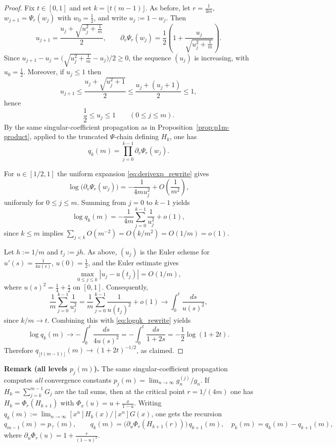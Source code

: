 \documentclass[11pt]{article}
\newcommand{\ptop}{p_{\top}}
\begin{document}
\begin{proof}
Fix \(t\in[0,1]\) and set \(k=\lfloor t(m-1)\rfloor\). As before, let \(r=\frac{1}{4m}\),
\(w_{j+1}=\Psi_r(w_j)\) with \(w_0=\frac12\), and write \(u_j:=1-w_j\). Then
\[
u_{j+1}=\frac{u_j+\sqrt{u_j^2+\frac1m}}{2},
\qquad
\partial_v\Psi_r(w_j)=\frac12\left(1+\frac{u_j}{\sqrt{u_j^2+\frac1m}}\right).
\]
Since \(u_{j+1}-u_j=\bigl(\sqrt{u_j^2+\frac1m}-u_j\bigr)/2\ge0\), the sequence \((u_j)\) is
increasing, with \(u_0=\frac12\). Moreover, if \(u_j\le 1\) then
\[
u_{j+1}\le \frac{u_j+\sqrt{u_j^2+1}}{2}\le \frac{u_j+(u_j+1)}{2}\le 1,
\]
hence
\[
\frac12\le u_j\le 1\qquad (0\le j\le m).
\]
By the same singular-coefficient propagation as in Proposition~\ref{prop:p1m-product},
applied to the truncated \(\Psi\)-chain defining \(H_k\), one has
\[
q_k(m)=\prod_{j=0}^{k-1}\partial_v\Psi_r(w_j).
\]

\medskip
For \(u\in[1/2,1]\) the uniform expansion \eqref{eq:derivexp_rewrite} gives
\[
\log\bigl(\partial_v\Psi_r(w_j)\bigr)
=-\frac{1}{4m u_j^2}+O\!\left(\frac{1}{m^2}\right),
\]
uniformly for \(0\le j\le m\). Summing from \(j=0\) to \(k-1\) yields
\begin{equation}
\label{eq:logqk_rewrite}
\log q_k(m)
=-\frac{1}{4m}\sum_{j=0}^{k-1}\frac{1}{u_j^2}+o(1),
\end{equation}
since \(k\le m\) implies \(\sum_{j<k}O(m^{-2})=O(k/m^2)=O(1/m)=o(1)\).

\medskip
Let \(h:=1/m\) and \(t_j:=jh\). As above, \((u_j)\) is the Euler scheme for
\(u'(s)=\frac{1}{4u(s)}\), \(u(0)=\frac12\), and the Euler estimate gives
\[
\max_{0\le j\le k}|u_j-u(t_j)|=O(1/m),
\]
where \(u(s)^2=\frac14+\frac{s}{2}\) on \([0,1]\).
Consequently,
\[
\frac{1}{m}\sum_{j=0}^{k-1}\frac{1}{u_j^2}
=\frac{1}{m}\sum_{j=0}^{k-1}\frac{1}{u(t_j)^2}+o(1)
\longrightarrow \int_0^{t}\frac{ds}{u(s)^2},
\]
since \(k/m\to t\). Combining this with \eqref{eq:logqk_rewrite} yields
\[
\log q_k(m)\longrightarrow -\int_0^{t}\frac{ds}{4u(s)^2}
=-\int_0^{t}\frac{ds}{1+2s}
=-\frac12\log(1+2t).
\]
Therefore \(q_{\lfloor t(m-1)\rfloor}(m)\to (1+2t)^{-1/2}\), as claimed.
\end{proof}


\textbf{Remark (all levels \(p_j(m)\)).}
The same singular-coefficient propagation computes \emph{all} convergence constants
\(p_j(m)=\lim_{n\to\infty} g_n^{(j)}/g_n\).  If \(H_k=\sum_{j=k}^{m-1}G_j\) are the tail sums,
then at the critical point \(r=1/(4m)\) one has \(H_k=\Phi_r(H_{k+1})\) with
\(\Phi_x(u)=u+\frac{x}{1-u}\).  Writing \(q_k(m):=\lim_{n\to\infty} [x^n]H_k(x)/[x^n]G(x)\),
one gets the recursion
\[
q_{m-1}(m)=\ptop(m),\qquad
q_k(m)=\big(\partial_u\Phi_r(H_{k+1}(r))\big)\,q_{k+1}(m),
\quad
p_k(m)=q_k(m)-q_{k+1}(m),
\]
where \(\partial_u\Phi_r(u)=1+\frac{r}{(1-u)^2}\).
\end{document}

